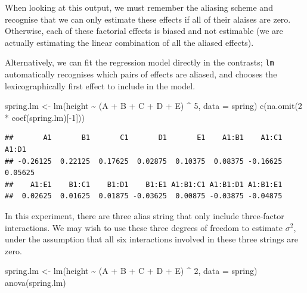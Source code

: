 \documentclass[
]{book}
\newenvironment{Shaded}{\begin{snugshade}}{\end{snugshade}}
\newcommand{\AttributeTok}[1]{\textcolor[rgb]{0.77,0.63,0.00}{#1}}
\newcommand{\DecValTok}[1]{\textcolor[rgb]{0.00,0.00,0.81}{#1}}
\newcommand{\FunctionTok}[1]{\textcolor[rgb]{0.00,0.00,0.00}{#1}}
\newcommand{\NormalTok}[1]{#1}
\newcommand{\OtherTok}[1]{\textcolor[rgb]{0.56,0.35,0.01}{#1}}
\newcommand{\SpecialCharTok}[1]{\textcolor[rgb]{0.00,0.00,0.00}{#1}}
\theoremstyle{definition}
\theoremstyle{definition}
\theoremstyle{definition}
\theoremstyle{definition}
\theoremstyle{remark}
\begin{document}
When looking at this output, we must remember the aliasing scheme and recognise that we can only estimate these effects if all of their alaises are zero. Otherwise, each of these factorial effects is biased and not estimable (we are actually estimating the linear combination of all the aliased effects).

Alternatively, we can fit the regression model directly in the contrasts; \texttt{lm} automatically recognises which pairs of effects are aliased, and chooses the lexicographically first effect to include in the model.

\begin{Shaded}
\begin{Highlighting}[]
\NormalTok{spring.lm }\OtherTok{\textless{}{-}} \FunctionTok{lm}\NormalTok{(height }\SpecialCharTok{\textasciitilde{}}\NormalTok{ (A }\SpecialCharTok{+}\NormalTok{ B }\SpecialCharTok{+}\NormalTok{ C }\SpecialCharTok{+}\NormalTok{ D }\SpecialCharTok{+}\NormalTok{ E) }\SpecialCharTok{\^{}} \DecValTok{5}\NormalTok{, }\AttributeTok{data =}\NormalTok{ spring)}
\FunctionTok{c}\NormalTok{(}\FunctionTok{na.omit}\NormalTok{(}\DecValTok{2} \SpecialCharTok{*} \FunctionTok{coef}\NormalTok{(spring.lm)[}\SpecialCharTok{{-}}\DecValTok{1}\NormalTok{]))}
\end{Highlighting}
\end{Shaded}

\begin{verbatim}
##       A1       B1       C1       D1       E1    A1:B1    A1:C1    A1:D1 
## -0.26125  0.22125  0.17625  0.02875  0.10375  0.08375 -0.16625  0.05625 
##    A1:E1    B1:C1    B1:D1    B1:E1 A1:B1:C1 A1:B1:D1 A1:B1:E1 
##  0.02625  0.01625  0.01875 -0.03625  0.00875 -0.03875 -0.04875
\end{verbatim}

In this experiment, there are three alias string that only include three-factor interactions. We may wish to use these three degrees of freedom to estimate \(\sigma^2\), under the assumption that all six interactions involved in these three strings are zero.

\begin{Shaded}
\begin{Highlighting}[]
\NormalTok{spring.lm }\OtherTok{\textless{}{-}} \FunctionTok{lm}\NormalTok{(height }\SpecialCharTok{\textasciitilde{}}\NormalTok{ (A }\SpecialCharTok{+}\NormalTok{ B }\SpecialCharTok{+}\NormalTok{ C }\SpecialCharTok{+}\NormalTok{ D }\SpecialCharTok{+}\NormalTok{ E) }\SpecialCharTok{\^{}} \DecValTok{2}\NormalTok{, }\AttributeTok{data =}\NormalTok{ spring)}
\FunctionTok{anova}\NormalTok{(spring.lm)}
\end{Highlighting}
\end{Shaded}
\end{document}
